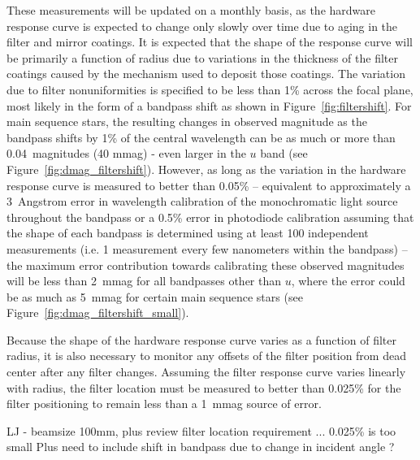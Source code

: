 \documentclass[12pt,preprint]{aastex}
\begin{document}
These measurements will be updated on a monthly basis, as the hardware
response curve is expected to change only slowly over time due to
aging in the filter and mirror coatings. It is expected that the shape
of the response curve will be primarily a function of radius due to
variations in the thickness of the filter coatings caused by the
mechanism used to deposit those coatings. The variation due to filter
nonuniformities is specified to be less than 1\% across the focal
plane, most likely in the form of a bandpass shift as shown in
Figure~\ref{fig:filtershift}. For main sequence stars, the resulting
changes in observed magnitude as the bandpass shifts by 1\% of the
central wavelength can be as much or more than 0.04~magnitudes (40
mmag) - even larger in the $u$ band (see
Figure~\ref{fig:dmag_filtershift}). However, as long as the variation
in the hardware response curve is measured to better than 0.05\% --
equivalent to approximately a 3~Angstrom error in wavelength
calibration of the monochromatic light source throughout the bandpass
or a 0.5\% error in photodiode calibration assuming that the shape of
each bandpass is determined using at least 100 independent
measurements (i.e. 1 measurement every few nanometers within the bandpass) --
the maximum error contribution towards calibrating these observed magnitudes
will be less than 2~mmag for all bandpasses other than $u$, where the
error could be as much as 5~mmag for certain main sequence stars (see
Figure~\ref{fig:dmag_filtershift_small}). 

Because the shape of the hardware response curve varies as a function
of filter radius, it is also necessary to monitor any offsets of the
filter position from dead center after any filter changes. Assuming
the filter response curve varies linearly with radius, the filter
location must be measured to better than 0.025\%  for the filter
positioning to remain less than a 1~mmag source of error. 

LJ - beamsize 100mm, plus review filter location requirement ... 0.025\% is too small
Plus need to include shift in bandpass due to change in incident angle ? 
\end{document}
